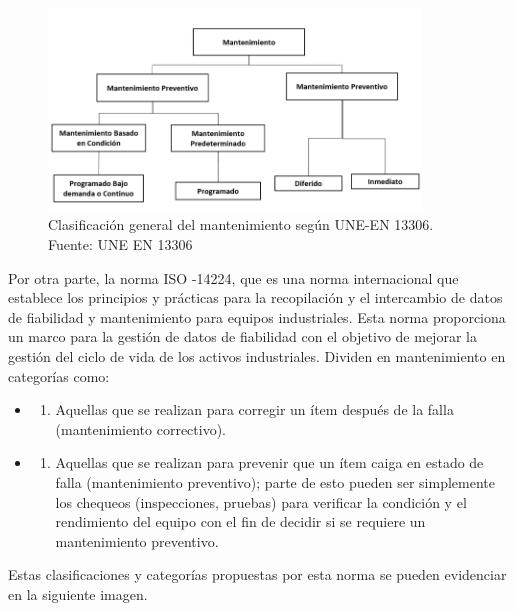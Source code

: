 \documentclass[
  11pt,
  bookmarksnumbered]{article}
\providecommand{\tightlist}{%
  \setlength{\itemsep}{0pt}\setlength{\parskip}{0pt}}
\begin{document}
\begin{figure}

{\centering \includegraphics[width=3.9in]{Imagenes/TiposdeMtto} 

}

\caption{Clasificación general del mantenimiento según UNE-EN 13306. Fuente: UNE EN 13306}\label{fig:unnamed-chunk-1}
\end{figure}

Por otra parte, la norma ISO -14224, que es una norma internacional que establece los principios y prácticas para la recopilación y el intercambio de datos de fiabilidad y mantenimiento para equipos industriales.
Esta norma proporciona un marco para la gestión de datos de fiabilidad con el objetivo de mejorar la gestión del ciclo de vida de los activos industriales.
Dividen en mantenimiento en categorías como:

\begin{itemize}
\item
  \begin{enumerate}
  \def\labelenumi{\alph{enumi})}
  \tightlist
  \item
    Aquellas que se realizan para corregir un ítem después de la falla (mantenimiento correctivo).
  \end{enumerate}
\item
  \begin{enumerate}
  \def\labelenumi{\alph{enumi})}
  \setcounter{enumi}{1}
  \tightlist
  \item
    Aquellas que se realizan para prevenir que un ítem caiga en estado de falla (mantenimiento preventivo); parte de esto pueden ser simplemente los chequeos (inspecciones, pruebas) para verificar la condición y el rendimiento del equipo con el fin de decidir si se requiere un mantenimiento preventivo.
  \end{enumerate}
\end{itemize}

Estas clasificaciones y categorías propuestas por esta norma se pueden evidenciar en la siguiente imagen.
\end{document}
